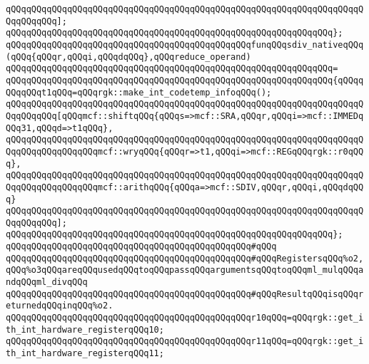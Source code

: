 \verb|qQQqqQQqqQQqqQQqqQQqqQQqqQQqqQQqqQQqqQQqqQQqqQQqqQQqqQQqqQQqqQQqqQQqqQQqqQQqqQQq];|\newline
\verb|qQQqqQQqqQQqqQQqqQQqqQQqqQQqqQQqqQQqqQQqqQQqqQQqqQQqqQQqqQQqqQQq};|\newline
\newline
\verb|qQQqqQQqqQQqqQQqqQQqqQQqqQQqqQQqqQQqqQQqqQQqqQQqfunqQQqsdiv_nativeqQQq(qQQq{qQQqr,qQQqi,qQQqdqQQq},qQQqreduce_operand)|\newline
\verb|qQQqqQQqqQQqqQQqqQQqqQQqqQQqqQQqqQQqqQQqqQQqqQQqqQQqqQQqqQQqqQQq=|\newline
\verb|qQQqqQQqqQQqqQQqqQQqqQQqqQQqqQQqqQQqqQQqqQQqqQQqqQQqqQQqqQQqqQQq{qQQqqQQqqQQqt1qQQq=qQQqrgk::make_int_codetemp_infoqQQq();|\newline
\newline
\verb|qQQqqQQqqQQqqQQqqQQqqQQqqQQqqQQqqQQqqQQqqQQqqQQqqQQqqQQqqQQqqQQqqQQqqQQqqQQqqQQq[qQQqmcf::shiftqQQq{qQQqs=>mcf::SRA,qQQqr,qQQqi=>mcf::IMMEDqQQq31,qQQqd=>t1qQQq},|\newline
\verb|qQQqqQQqqQQqqQQqqQQqqQQqqQQqqQQqqQQqqQQqqQQqqQQqqQQqqQQqqQQqqQQqqQQqqQQqqQQqqQQqqQQqqQQqmcf::wryqQQq{qQQqr=>t1,qQQqi=>mcf::REGqQQqrgk::r0qQQq},|\newline
\verb|qQQqqQQqqQQqqQQqqQQqqQQqqQQqqQQqqQQqqQQqqQQqqQQqqQQqqQQqqQQqqQQqqQQqqQQqqQQqqQQqqQQqqQQqmcf::arithqQQq{qQQqa=>mcf::SDIV,qQQqr,qQQqi,qQQqdqQQq}|\newline
\verb|qQQqqQQqqQQqqQQqqQQqqQQqqQQqqQQqqQQqqQQqqQQqqQQqqQQqqQQqqQQqqQQqqQQqqQQqqQQqqQQq];|\newline
\verb|qQQqqQQqqQQqqQQqqQQqqQQqqQQqqQQqqQQqqQQqqQQqqQQqqQQqqQQqqQQqqQQq};|\newline
\newline
\verb|qQQqqQQqqQQqqQQqqQQqqQQqqQQqqQQqqQQqqQQqqQQqqQQq#qQQq|\newline
\verb|qQQqqQQqqQQqqQQqqQQqqQQqqQQqqQQqqQQqqQQqqQQqqQQq#qQQqRegistersqQQq%o2,qQQq%o3qQQqareqQQqusedqQQqtoqQQqpassqQQqargumentsqQQqtoqQQqml_mulqQQqandqQQqml_divqQQq|\newline
\verb|qQQqqQQqqQQqqQQqqQQqqQQqqQQqqQQqqQQqqQQqqQQqqQQq#qQQqResultqQQqisqQQqreturnedqQQqinqQQq%o2.|\newline
\newline
\verb|qQQqqQQqqQQqqQQqqQQqqQQqqQQqqQQqqQQqqQQqqQQqqQQqr10qQQq=qQQqrgk::get_ith_int_hardware_registerqQQq10;|\newline
\verb|qQQqqQQqqQQqqQQqqQQqqQQqqQQqqQQqqQQqqQQqqQQqqQQqr11qQQq=qQQqrgk::get_ith_int_hardware_registerqQQq11;|\newline
\newline
